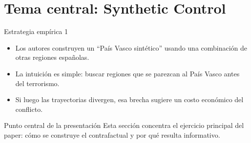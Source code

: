 \documentclass[aspectratio=1610]{beamer}
\begin{document}
\section{Tema central: Synthetic Control}

\begin{frame}{Estrategia empírica 1}
    \begin{itemize}
        \item Los autores construyen un ``País Vasco sintético'' usando una combinación de otras regiones españolas.
        \item La intuición es simple: buscar regiones que se parezcan al País Vasco antes del terrorismo.
        \item Si luego las trayectorias divergen, esa brecha sugiere un costo económico del conflicto.
    \end{itemize}
\begin{block}{Punto central de la presentación}
    Esta sección concentra el ejercicio principal del paper: cómo se construye el contrafactual y por qué resulta informativo.
\end{block}
\end{frame}
\end{document}

